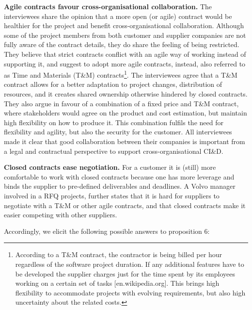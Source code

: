 {\bf Agile contracts favour cross-organisational collaboration.} The interviewees share the opinion that a more open (or agile) contract would be healthier for the project and benefit cross-organisational collaboration. Although some of the project members from both customer and supplier companies are not fully aware of the contract details, they do share the feeling of being restricted. They believe that strict contracts conflict with an agile way of working instead of supporting it, and suggest to adopt more agile contracts, instead, also referred to as Time and Materials (T\&M) contracts\footnote{According to a T\&M contract, the contractor is being billed per hour regardless of the software project duration. If any additional features have to be developed the supplier charges just for the time spent by its employees working on a certain set of tasks [en.wikipedia.org]. This brings high flexibility to accommodate projects with evolving requirements, but also high uncertainty about the related costs.}. 
The interviewees agree that a T\&M contract allows for a better adaptation to project changes, distribution of resources, and it creates shared ownership otherwise hindered by closed contracts. They also argue in favour of a combination of a fixed price and T\&M contract, where stakeholders would agree on the product and cost estimation, but maintain high flexibility on how to produce it. This combination fulfils the need for flexibility and agility, but also the security for the customer. All interviewees made it clear that good collaboration between their companies is important from a legal and contractual perspective to support cross-organisational CI\&D.

{\bf Closed contracts ease negotiation.} For a customer it is (still) more comfortable to work with closed contracts because one has more leverage and binds the supplier to pre-defined deliverables and deadlines. A Volvo manager involved in a RFQ projects, further states that it is hard for suppliers to negotiate with a T\&M or other agile contracts, and that closed contracts make it easier competing with other suppliers.


Accordingly, we elicit the following possible answers to proposition 6:

